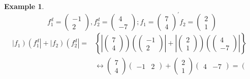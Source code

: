 \documentclass[aps,preprint]{revtex4}
\newtheorem{example}[theorem]{Example}
\begin{document}
\begin{example}
\begin{equation}
f_{1}^{d}=\left( 
\begin{array}{c}
-1 \\ 
2%
\end{array}%
\right) ,f_{2}^{d}=\left( 
\begin{array}{c}
4 \\ 
-7%
\end{array}%
\right) ;f_{1}=\left( 
\begin{array}{c}
7 \\ 
4%
\end{array}%
\right) ^{\prime }f_{2}=\left( 
\begin{array}{c}
2 \\ 
1%
\end{array}%
\right)
\end{equation}%
\begin{align}
\left\vert f_{1}\right) \left( f_{1}^{d}\right\vert +\left\vert f_{2}\right)
\left( f_{2}^{d}\right\vert =& \left\{ \left\vert \left( 
\begin{array}{c}
7 \\ 
4%
\end{array}%
\right) \right) \left( \left( 
\begin{array}{c}
-1 \\ 
2%
\end{array}%
\right) \right\vert +\left\vert \left( 
\begin{array}{c}
2 \\ 
1%
\end{array}%
\right) \right) \left( \left( 
\begin{array}{c}
4 \\ 
-7%
\end{array}%
\right) \right\vert \right\} \\
& \leftrightarrow \left( 
\begin{array}{c}
7 \\ 
4%
\end{array}%
\right) \left( 
\begin{array}{cc}
-1 & 2%
\end{array}%
\right) +\left( 
\begin{array}{c}
2 \\ 
1%
\end{array}%
\right) \left( 
\begin{array}{cc}
4 & -7%
\end{array}%
\right) =\left( 
\begin{array}{cc}

\end{array}
\end{align}
\end{example}
\end{document}
